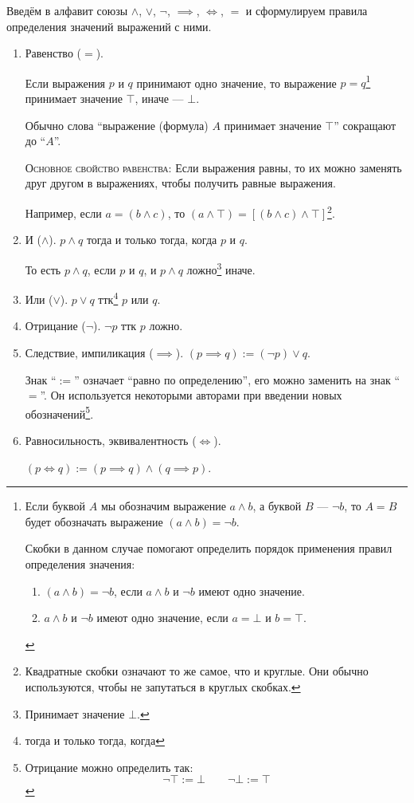 Введём в алфавит союзы $\land$, $\lor$, $\lnot$, $\implies$, $\iff$, $=$
и сформулируем правила определения значений выражений с ними.
\begin{enumerate}
	\item{}Равенство ($=$).

	Если выражения $p$ и $q$ принимают одно значение,
	то выражение $p=q$\footnote[][-2cm]{
		Если буквой $A$ мы обозначим выражение $a\land b$,
		а буквой $B$ --- $\lnot b$, то $A=B$ будет обозначать выражение
		${(a\land b)=\lnot b}$.

		Скобки в данном случае помогают определить порядок
		применения правил определения значения:
		\begin{enumerate}
			\item{}${(a\land b)=\lnot b}$,
			если $a\land b$ и $\lnot b$ имеют одно значение.
			\item{}$a\land b$ и $\lnot b$ имеют одно значение, если
			$a=\bot$ и $b=\top$.
		\end{enumerate}
	} принимает значение $\top$, иначе --- $\bot$.

	Обычно слова ``выражение (формула) $A$ принимает значение $\top$''
	сокращают до ``$A$''.

	\textsc{Основное свойство равенства:} Если выражения равны, то их можно
	заменять друг другом в выражениях, чтобы получить равные выражения.

	Например, если $a=(b\land c)$, то $(a\land\top)=[(b\land c)\land\top]$\footnote{
		Квадратные скобки означают то же самое,
		что и круглые. Они обычно используются, чтобы не запутаться в круглых скобках.
	}.

	\item{}И ($\land$). $p\land q$ тогда и только тогда, когда $p$ и $q$.

	То есть $p\land q$, если $p$ и $q$,
	и $p\land q$ ложно\footnote{Принимает значение $\bot$.} иначе.

	\item{}Или ($\lor$). $p\lor q$ ттк\footnote{тогда и только тогда, когда} $p$ или $q$.

	\item{}Отрицание ($\lnot$). $\lnot p$ ттк $p$ ложно.

	\item{}Следствие, импиликация ($\implies$). $(p\implies q):=(\lnot p)\lor q$.

	Знак ``$:=$'' означает ``равно по определению'', его можно заменить
	на знак ``$=$''. Он используется некоторыми авторами при введении новых
	обозначений\footnote{
		Отрицание можно определить так:
		\[
			\lnot\top:=\bot\qquad \lnot\bot:=\top
		\]
	}.

	\item{}Равносильность, эквивалентность ($\iff$).

	$(p\iff q):=(p\implies q)\land (q\implies p)$.
\end{enumerate}

